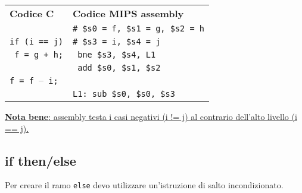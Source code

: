 \documentclass[../main.tex]{subfiles}
\begin{document}
\noindent
\begin{tabular}{ p{7cm} p{7cm} }
    \textbf{Codice C} & \textbf{Codice MIPS assembly} \\
    & \texttt{\# \$s0 = f, \$s1 = g, \$s2 = h} \\
	\texttt{if (i == j)} & \texttt{\# \$s3 = i, \$s4 = j} \\
    \texttt{ \hspace*{0cm} f = g + h;} & \texttt{ \hspace*{0cm} bne \$s3, \$s4, L1} \\
    & \texttt{ \hspace*{0cm} add \$s0, \$s1, \$s2} \\
    \texttt{f = f $–$ i;} \\
    & \texttt{L1: sub \$s0, \$s0, \$s3} \\
\end{tabular}

\vspace*{2.5mm}

\noindent
\underline{\textbf{Nota bene}: assembly testa i casi negativi (i != j)
al contrario dell'alto livello (i == j).}

\subsection{if then/else}
\vspace*{-2mm}
Per creare il ramo \texttt{else} devo utilizzare un'istruzione di salto
incondizionato.

\vspace*{2.5mm}
\end{document}
